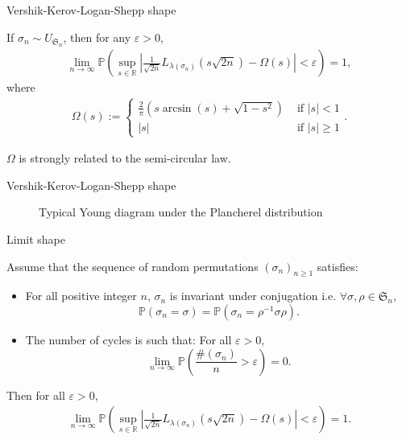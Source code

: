 \documentclass[english,xcolor=table]{beamer}
\begin{document}
\begin{frame}{Vershik-Kerov-Logan-Shepp shape}
    \begin{theorem}
    If $\sigma_n \sim U_{\mathfrak{S}_n}$, then for any $\varepsilon>0$,
\begin{align*}
\lim_{n\to \infty} \mathbb{P}\left(\sup_{s\in \mathbb{R}} \left|\frac{1}{\sqrt{2n}}L_{\lambda(\sigma_n)}\left({s}{\sqrt{2n}}\right)-\Omega(s)\right|<\varepsilon\right) =1,
\end{align*}
where
\begin{align*}
\Omega(s):=\begin{cases}
\frac{2}{\pi}(s\arcsin({s})+\sqrt{1-s^2}) & \text{ if } |s|<1 \\ 
|s| & \text{ if } |s|\geq 1 
\end{cases}.
\end{align*}
    \end{theorem}
    \vspace{10 mm}

     $\Omega$ is strongly related to the semi-circular law.
\end{frame}
\begin{frame}{Vershik-Kerov-Logan-Shepp shape}
    \begin{figure}[ht]
    \centering
     \def\svgscale{.65}
    
       

    \caption{Typical Young diagram under the Plancherel distribution}
\end{figure}

\end{frame}


 \begin{frame}{Limit shape}
    \begin{theorem}[\cite{sk}]
Assume that the sequence of random permutations  $(\sigma_n)_{n\geq 1}$ satisfies:
\begin{itemize}
\item  For all positive integer $n$, $\sigma_n$ is invariant under conjugation i.e.  $\forall \sigma , \rho \in \mathfrak{S}_n$,
\begin{equation}\tag{H1}
\mathbb{P}(\sigma_n=\sigma)=\mathbb{P}(\sigma_n=\rho^{-1}\sigma\rho).
\end{equation}
\item The number of cycles is such that: For all $\varepsilon>0$,
\begin{equation}\tag{H3}
\lim_{n\to \infty}\mathbb{P}\left(\frac{\#(\sigma_n)}{n}>\varepsilon\right) =0.
\end{equation}
\end{itemize}
Then  for all  $\varepsilon>0$,
\begin{align*}
\lim_{n\to \infty} \mathbb{P}\left(\sup_{s\in \mathbb{R}} \left|\frac{1}{\sqrt{2n}}L_{\lambda(\sigma_n)}\left({s}{\sqrt{2n}}\right)-\Omega(s)\right|<\varepsilon\right) =1.
\end{align*}
\end{theorem}
\end{frame}
\end{document}
